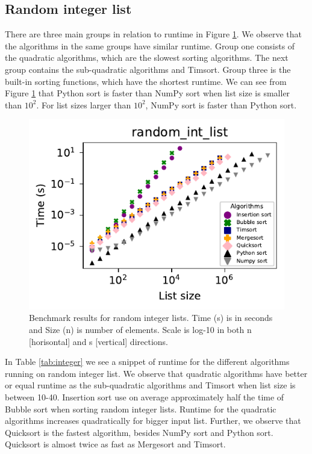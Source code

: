 \documentclass[sigconf, nonacm, natbib, screen, balance=False]{acmart}
\begin{document}
\subsection{Random integer list}

There are three main groups in relation to runtime in Figure \ref{fig:rand_int}. We observe that the algorithms in the same groups have similar runtime. Group one consists of the quadratic algorithms, which are the slowest sorting algorithms. The next group contains the sub-quadratic algorithms and Timsort. Group three is the built-in sorting functions, which have the shortest runtime. We can see from Figure \ref{fig:rand_int} that Python sort is faster than NumPy sort when list size is smaller than $10^2$. For list sizes larger than $10^2$, NumPy sort is faster than Python sort.


\begin{figure}[h!]
  \includegraphics[width=\linewidth]{../figures/random_int_list.pdf}
  \caption{Benchmark results for random integer lists. Time (s) is in seconds and Size (n) is number of elements. Scale is log-10 in both n [horisontal] and s [vertical] directions.}
  \label{fig:rand_int}
\end{figure}
\FloatBarrier


In Table \ref{tab:integer} we see a snippet of runtime for the different algorithms running on random integer list. We observe that quadratic algorithms have better or equal runtime as the sub-quadratic algorithms and Timsort when list size is between 10-40. Insertion sort use on average approximately half the time of Bubble sort when sorting random integer lists. Runtime for the quadratic algorithms increases quadratically for bigger input list. Further, we observe that Quicksort is the fastest algorithm, besides NumPy sort and Python sort. Quicksort is almost twice as fast as Mergesort and Timsort.
\end{document}
